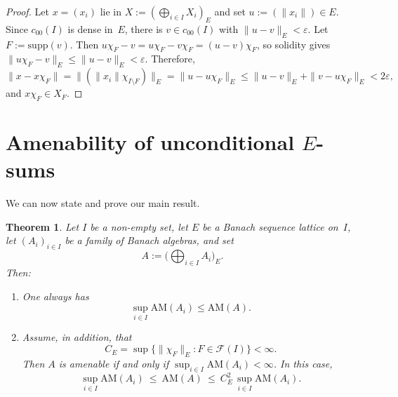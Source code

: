 \documentclass[reqno]{amsart}
\theoremstyle{plain}
\newtheorem{theorem}{Theorem}[section]
\theoremstyle{definition}
\theoremstyle{remark}
\newcommand{\AM}{\mathrm{AM}}
\newcommand{\cF}{\mathcal{F}}
\newcommand{\czerozero}{c_{00}}
\renewcommand{\le}{\leqslant}
\begin{document}
\begin{proof}
Let $x=(x_i)$ lie in $X:=(\bigoplus_{i\in I}X_i)_E$ and set $u:=(\|x_i\|)\in E$.
Since $\czerozero(I)$ is dense in~$E$, there is $v\in\czerozero(I)$ with $\|u-v\|_E<\varepsilon$.
Let $F:=\mathrm{supp}(v)$.
Then $u\chi_F-v=u\chi_F-v\chi_F=(u-v)\chi_F$, so solidity gives
$\|u\chi_F-v\|_E\le \|u-v\|_E<\varepsilon$.
Therefore,
\[
\|x-x\chi_F\|=\|(\|x_i\|\chi_{I\setminus F})\|_E
=\|u-u\chi_F\|_E
\le \|u-v\|_E+\|v-u\chi_F\|_E <2\varepsilon,
\]
and $x\chi_F\in X_F$.
\end{proof}

\section{Amenability of unconditional $E$-sums}\label{sec:main}

We can now state and prove our main result.

\begin{theorem}\label{thm:main}
Let $I$ be a non-empty set, let $E$ be a Banach sequence lattice on~$I$, let $(A_i)_{i\in I}$ be a family of Banach algebras, and set
\[
A:=\Big(\bigoplus_{i\in I}A_i\Big)_{\!E}.
\]
Then:
\begin{enumerate}[label={\rm(\arabic*)},leftmargin=3.2em]
\item One always has
\[
\sup_{i\in I}\AM(A_i)\le \AM(A).
\]
\item Assume, in addition, that
\[
C_E=\sup\{\|\chi_F\|_E: F\in \cF(I)\}<\infty.
\]
Then $A$ is amenable if and only if $\sup_{i\in I}\AM(A_i)<\infty$.  In this case,
\[
\sup_{i\in I}\AM(A_i)\ \le\ \AM(A)\ \le\ C_E^2\,\sup_{i\in I}\AM(A_i).
\]
\end{enumerate}
\end{theorem}
\end{document}
